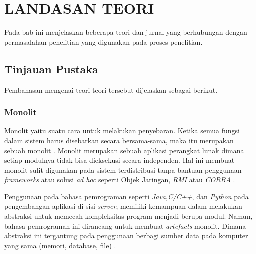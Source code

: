 \chapter{LANDASAN TEORI}
\vspace{4.5pt}
Pada bab ini menjelaskan beberapa teori dan jurnal yang berhubungan dengan permasalahan penelitian yang digunakan pada proses penelitian.
\section{Tinjauan Pustaka}
Pembahasan mengenai teori-teori tersebut dijelaskan sebagai berikut.
\subsection{Monolit}
Monolit yaitu suatu cara untuk melakukan penyebaran. Ketika semua fungsi dalam sistem harus disebarkan secara bersama-sama, maka itu merupakan sebuah monolit \cite{74C}. Monolit merupakan sebuah aplikasi perangkat lunak dimana setiap modulnya tidak bisa dieksekusi secara independen. Hal ini membuat monolit sulit digunakan pada sistem terdistribusi tanpa bantuan penggunaan \textit{frameworks} atau solusi \textit{ad hoc} seperti Objek Jaringan, \textit{RMI} atau \textit{CORBA} \cite{0BD}.

Penggunaan pada bahasa pemrograman seperti \textit{Java},\textit{C/C++}, dan \textit{Python} pada pengembangan aplikasi di sisi \textit{server}, memiliki kemampuan dalam melakukan abstraksi untuk memecah kompleksitas program menjadi berupa modul. Namun, bahasa pemrograman ini dirancang untuk membuat \textit{artefacts} monolit. Dimana abstraksi ini tergantung pada penggunaan berbagi sumber data pada komputer yang sama (memori, database, file) \cite{0BD}.



